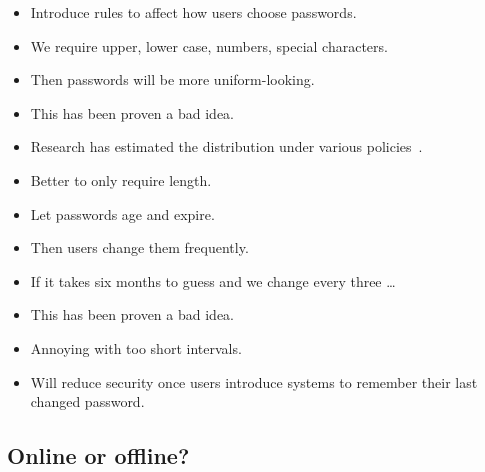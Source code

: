 \begin{frame}
  \begin{idea}
    \begin{itemize}
      \item Introduce rules to affect how users choose passwords.
      \item We require upper, lower case, numbers, special characters.
      \item Then passwords will be more uniform-looking.
    \end{itemize}
  \end{idea}

  \begin{remark}[Usability]
    \begin{itemize}
      \item This has been proven a bad idea.
      \item Research has estimated the distribution under various 
        policies~\cite{Komanduri2011opa}.
      \item Better to only require length.
    \end{itemize}
  \end{remark}
\end{frame}

\begin{frame}
  \begin{idea}
    \begin{itemize}
      \item Let passwords age and expire.
      \item Then users change them frequently.
      \item If it takes six months to guess and we change every three \dots
    \end{itemize}
  \end{idea}

  \begin{remark}[Usability]
    \begin{itemize}
      \item This has been proven a bad idea.
      \item Annoying with too short intervals.
      \item Will reduce security once users introduce systems to remember their 
        last changed password.
    \end{itemize}
  \end{remark}
\end{frame}


\subsection{Online or offline?}

